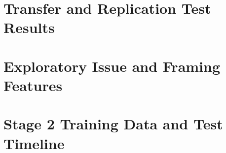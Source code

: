 \documentclass[final-report]{report-template}
\begin{document}
\clearpage
\section{Transfer and Replication Test Results}

\begin{table}[htbp]
  \centering\small
  
  \caption{Full results for the Woking South and Haslemere transfer tests. Woking South results are measured relative to the no-news baseline (MAE 10.085), and Haslemere results are measured relative to the non-news adjustment control (MAE 4.491). The asterisk marks the specification selected by the pre-registered rule as the arm with the highest 2026 $\Delta$MAE in each window. Haslemere replayed only the two confirmatory arms, combined and national news, so local entries are shown as ``--''. Its news corpus contained 20 articles, but only three mentioned a study party.}
  \label{tab:blind-tests}
\end{table}



\clearpage
\section{Exploratory Issue and Framing Features}

\begin{table}[htbp]
\centering\footnotesize

\caption{Exploratory results for seven issue and framing features defined before fitting. Each was added separately to the frozen specification. In the 31--90 day window, the +0.3413 volume-plus-stance improvement was used as the reference. The final row tests all seven features together for overfitting. Only the 91--180 and 31--90 day windows met the ten-value reporting threshold. At 91--180 days, six feature effects were negative, matching the frozen news effect, with confidence intervals below zero. The immigration effect was the exception, with a confidence interval including zero.}
\label{tab:a13-content-features}
\end{table}

\clearpage
\section{Stage 2 Training Data and Test Timeline}
\label{app:stage2-fitting-cells}

\begin{table}[H]
  \centering
  \resizebox{\textwidth}{!}{%
  }
  \caption{Stage 2 fitting cells and the frozen 2026 test set. All training elections pre-date the June 2026 project start. The v1 and v2 freeze commits precede the final news-layer unblinding commit, as verified by the committed repository audit.}
\label{tab:a20-fitting-cells}
\end{table}
\end{document}

